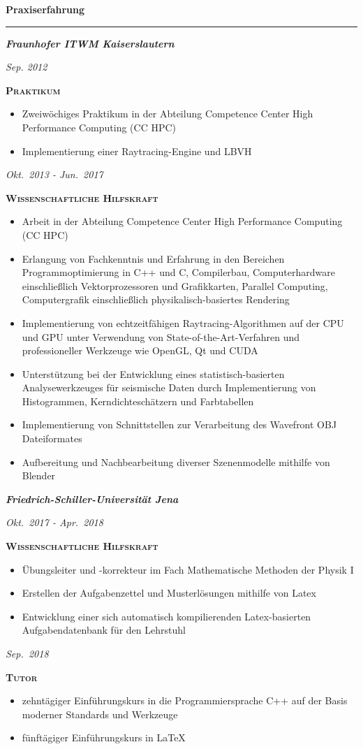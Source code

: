 \documentclass[8pt]{article}
\newcommand{\cvSectionStyle}{%
  \normalfont%
  \Large%
  \color{cvColor}%
  \bfseries%
  \sffamily%
}
\newcommand{\cvSubsectionStyle}{%
  \normalfont%
  \sffamily%
  \itshape%
  \bfseries%
}
\newcommand{\cvTimeStyle}{%
  \normalfont%
  \sffamily%
  \footnotesize%
  \itshape%
}
\newcommand{\cvSection}[1]{%
  \smallskip%
  {%
    \cvSectionStyle #1%
  }\\[-0.5em]
  \rule{\linewidth}{0.8pt}%
  \par%
  \smallskip%
}
\newcommand{\cvSubsection}[1]{%
  \begin{tcolorbox}[left=0pt, top=0pt, bottom=0pt, right=0pt, boxsep=5pt, arc=5pt, frame code={}, colback=cvBackgroundColor]
    \cvSubsectionStyle #1%
  \end{tcolorbox}
}
\newenvironment{cvItemize}{%
  \begin{itemize}[itemsep=0mm, leftmargin=4mm]
}{%
  \end{itemize}
}
\newenvironment{cvTimeItem}[2]{
  \par
  \begin{minipage}[c]{0.15\linewidth}
    \raggedleft
    \cvTimeStyle #1
  \end{minipage}
  \quad
  \vrule
  \quad
  \begin{minipage}[t]{0.79\linewidth}
    \sffamily\textsc{\color{cvColor} \textbf{#2}}
    \normalfont\footnotesize\sffamily
}{
  \end{minipage}
  \par%
  \vspace{\baselineskip}%
}
\begin{document}
  \cvSection{Praxiserfahrung}
  \cvSubsection{Fraunhofer ITWM Kaiserslautern}
  \begin{cvTimeItem}{Sep. 2012}{Praktikum}
  \begin{cvItemize}
    \item Zweiwöchiges Praktikum in der Abteilung Competence Center High Performance Computing (CC HPC)
    \item Implementierung einer Raytracing-Engine und LBVH
  \end{cvItemize}
  \end{cvTimeItem}
  \begin{cvTimeItem}{Okt.~2013 - Jun.~2017}{Wissenschaftliche Hilfskraft}
  \begin{cvItemize}
    \item Arbeit in der Abteilung Competence Center High Performance Computing (CC HPC)
    \item Erlangung von Fachkenntnis und Erfahrung in den Bereichen Programmoptimierung in C++ und C, Compilerbau, Computerhardware einschließlich Vektorprozessoren und Grafikkarten, Parallel Computing, Computergrafik einschließlich physikalisch-basiertes Rendering
    \item Implementierung von echtzeitfähigen Raytracing-Algorithmen auf der CPU und GPU unter Verwendung von State-of-the-Art-Verfahren und professioneller Werkzeuge wie OpenGL, Qt und CUDA
    \item Unterstützung bei der Entwicklung eines statistisch-basierten Analysewerkzeuges für seismische Daten durch Implementierung von Histogrammen, Kerndichteschätzern und Farbtabellen
    \item Implementierung von Schnittstellen zur Verarbeitung des Wavefront OBJ Dateiformates
    \item Aufbereitung und Nachbearbeitung diverser Szenenmodelle mithilfe von Blender
  \end{cvItemize}
  \end{cvTimeItem}

  \cvSubsection{Friedrich-Schiller-Universität Jena}
  \begin{cvTimeItem}{Okt.~2017 - Apr.~2018}{Wissenschaftliche Hilfskraft}
  \begin{cvItemize}
    \item Übungsleiter und -korrekteur im Fach Mathematische Methoden der Physik I
    \item Erstellen der Aufgabenzettel und Musterlösungen mithilfe von Latex
    \item Entwicklung einer sich automatisch kompilierenden Latex-basierten Aufgabendatenbank für den Lehrstuhl
  \end{cvItemize}
  \end{cvTimeItem}
  \begin{cvTimeItem}{Sep.~2018}{Tutor}
  \begin{cvItemize}
    \item zehntägiger Einführungskurs in die Programmiersprache C++ auf der Basis moderner Standards und Werkzeuge
    \item fünftägiger Einführungskurs in LaTeX
  \end{cvItemize}
  \end{cvTimeItem}
\end{document}

